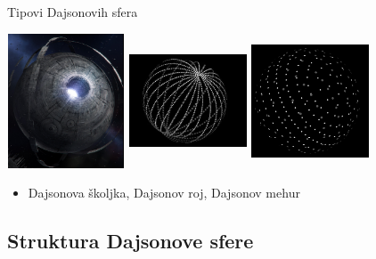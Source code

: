 \documentclass[13pt]{beamer}
\begin{document}
\begin{frame}{Tipovi Dajsonovih sfera}

\includegraphics[width=3.5cm, height=4cm]{images/Dajsonova skoljka.png}
\includegraphics[width=3.5cm, height=4cm]{images/Dajsonov roj.png}
\includegraphics[width=3.5cm, height=4cm]{images/Dajsonov mehur.png}

\begin{itemize}
    \item Dajsonova školjka, Dajsonov roj, Dajsonov mehur
\end{itemize}

\end{frame}

\subsection{Struktura Dajsonove sfere}
\end{document}
